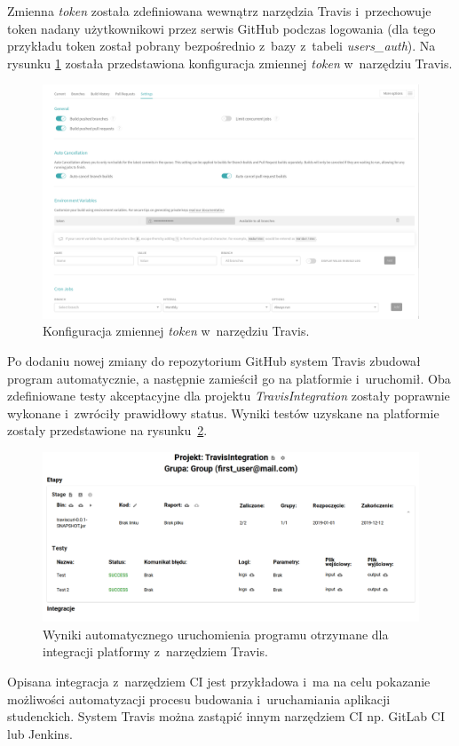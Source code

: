Zmienna \textit{token} została zdefiniowana wewnątrz narzędzia Travis i~przechowuje token nadany użytkownikowi przez serwis GitHub podczas logowania (dla tego przykładu token został pobrany bezpośrednio z~bazy z~tabeli \textit{users\_auth}).
Na rysunku \ref{fig:travis_integration_internal} została przedstawiona konfiguracja zmiennej \textit{token} w~narzędziu Travis.

\begin{figure}[h]
    \centering
    \includegraphics[width = 16cm]{chapter05/travis_integration_internal.png}
    \caption{Konfiguracja zmiennej \textit{token} w~narzędziu Travis.}
    \label{fig:travis_integration_internal}
\end{figure}

Po dodaniu nowej zmiany do repozytorium GitHub system Travis zbudował program automatycznie, a następnie zamieścił go na platformie i~uruchomił.
Oba zdefiniowane testy akceptacyjne dla projektu \textit{TravisIntegration} zostały poprawnie wykonane i~zwróciły prawidłowy status.
Wyniki testów uzyskane na platformie zostały przedstawione na rysunku~\ref{fig:travis_integration_result}.

\begin{figure}[H]
    \centering
    \includegraphics[width = 16cm]{chapter05/travis_integration_result.png}
    \caption{Wyniki automatycznego uruchomienia programu otrzymane dla integracji platformy z~narzędziem Travis.}
    \label{fig:travis_integration_result}
\end{figure}

Opisana integracja z~narzędziem CI jest przykładowa i~ma na celu pokazanie możliwości automatyzacji procesu budowania i~uruchamiania aplikacji studenckich.
System Travis można zastąpić innym narzędziem CI np. GitLab CI lub Jenkins.